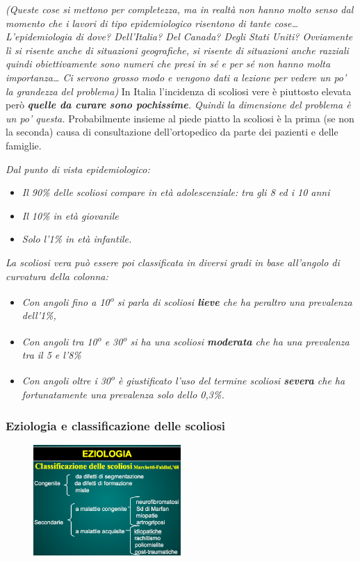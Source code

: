 \emph{(Queste cose si mettono per completezza, ma in realtà non hanno molto senso dal
momento che i lavori di tipo epidemiologico risentono di tante
cose\ldots{} L'epidemiologia di dove? Dell'Italia? Del Canada? Degli
Stati Uniti? Ovviamente lì si risente anche di situazioni geografiche,
si risente di situazioni anche razziali quindi obiettivamente sono
numeri che presi in sé e per sé non hanno molta importanza\ldots{} Ci
servono grosso modo e vengono dati a lezione per vedere un po' la
grandezza del problema)} In Italia l'incidenza di scoliosi vere è
piuttosto elevata però \emph{\textbf{quelle da curare} \textbf{sono
pochissime}. Quindi la dimensione del problema è un po' questa.}
Probabilmente insieme al piede piatto la scoliosi è la prima (se non la
seconda) causa di consultazione dell'ortopedico da parte dei pazienti e
delle famiglie.

\emph{Dal punto di vista epidemiologico:}

\begin{itemize}
\item
  \emph{Il 90\% delle scoliosi compare in \emph{età adolescenziale}: tra
  gli 8 ed i 10 anni}
\item
  \emph{Il 10\% in \emph{età giovanile}}
\item
  \emph{Solo l'1\% in \emph{età infantile}. }
\end{itemize}

\emph{La scoliosi vera può essere poi classificata in diversi gradi in
base all'angolo di curvatura della colonna: }

\begin{itemize}
\item
  \emph{Con angoli fino a 10\textsuperscript{o} si parla di scoliosi \textbf{lieve} che ha
  peraltro una prevalenza dell'1\%, }
\item
  \emph{Con angoli tra 10\textsuperscript{o} e 30\textsuperscript{o} si ha una scoliosi \textbf{moderata}
  che ha una prevalenza tra il 5 e l'8\%}
\item
  \emph{Con angoli oltre i 30\textsuperscript{o} è giustificato l'uso del termine scoliosi
  \textbf{severa} che ha fortunatamente una prevalenza solo dello
  0,3\%.}
\end{itemize}

\subsubsection{Eziologia e classificazione delle scoliosi}

\begin{figure}[!ht]
\centering
	\includegraphics[width=0.5\textwidth]{012/image7.png}
\end{figure}

